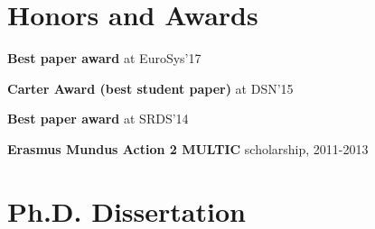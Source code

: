 \documentclass[letterpaper]{article}
\renewenvironment{itemize}{
  \begin{list}{}{
    \setlength{\leftmargin}{1.5em}
  }
}{
  \end{list}
}
\begin{document}
\section*{Honors and Awards}

\begin{itemize}
\item \textbf{Best paper award} at EuroSys'17
\item \textbf{Carter Award (best student paper)} at DSN'15
\item \textbf{Best paper award} at SRDS'14
\item \textbf{Erasmus Mundus Action 2 MULTIC} scholarship, 2011-2013

\end{itemize}


\section* {Ph.D. Dissertation}
\end{document}
